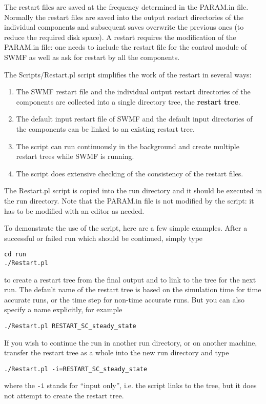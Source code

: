The restart files are saved at the frequency determined in the PARAM.in file.
Normally the restart files are saved into the output restart directories
of the individual components and subsequent saves overwrite the previous ones
(to reduce the required disk space). A restart requires the modification
of the PARAM.in file: one needs to include the restart file for the
control module of SWMF as well as ask for restart by all the components.

The Scripts/Restart.pl script simplifies the work of the restart in
several ways:
\begin{enumerate}
\item The SWMF restart file and the individual output restart 
directories of the components are collected into a single directory tree, 
the {\bf restart tree}.
\item The default input restart file of SWMF and the default 
      input directories of the components can be linked to an existing
      restart tree.
\item The script can run continuously in the background and create
      multiple restart trees while SWMF is running. 
\item The script does extensive checking of the consistency 
      of the restart files.
\end{enumerate}
The Restart.pl script is copied into the run directory and it should
be executed in the run directory. Note that the PARAM.in file is not
modified by the script: it has to be modified with an editor as needed.

To demonstrate the use of the script, here are a few simple examples.
After a successful or failed run which should be continued, simply type
\begin{verbatim}
cd run
./Restart.pl
\end{verbatim}
to create a restart tree from the final output and to link to the tree for the
next run. The default name of the restart tree is based on the simulation time
for time accurate runs, or the time step for non-time accurate runs.
But you can also specify a name explicitly, for example
\begin{verbatim}
./Restart.pl RESTART_SC_steady_state
\end{verbatim}
If you wish to continue the run in another run directory, or on another
machine, transfer the restart tree as a whole into the new run
directory and type
\begin{verbatim}
./Restart.pl -i=RESTART_SC_steady_state
\end{verbatim}
where the {\tt -i} stands for ``input only'', i.e. the script links to
the tree, but it does not attempt to create the restart tree.

